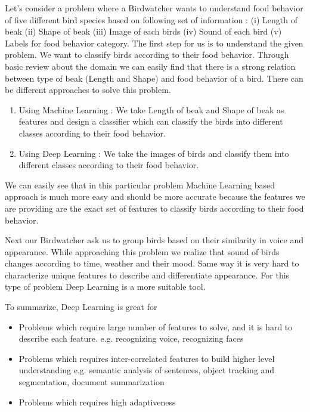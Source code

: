 \documentclass[a4paper]{article}
\begin{document}
Let's consider a problem where a Birdwatcher wants to understand food behavior of five different bird species based on following set of information : (i) Length of beak (ii) Shape of beak (iii) Image of each birds (iv) Sound of each bird (v) Labels for food behavior category. The first step for us is to understand the given problem. We want to classify birds according to their food behavior. Through basic review about the domain we can easily find that there is a strong relation between type of beak (Length and Shape) and food behavior of a bird. There can be different approaches to solve this problem. 

\begin{enumerate}
\item Using Machine Learning : We take Length of beak and Shape of beak as features and design a classifier which can classify the birds into different classes according to their food behavior. 
\item Using Deep Learning : We take the images of birds and classify them into different classes according to their food behavior.   
\end{enumerate}

We can easily see that in this particular problem Machine Learning based approach is much more easy and should be more accurate because the features we are providing are the exact set of features to classify birds according to their food behavior. 

Next our Birdwatcher ask us to group birds based on their similarity in voice and appearance. While approaching this problem we realize that sound of birds changes according to time, weather and their mood. Same way it is very hard to characterize unique features to describe and differentiate appearance. For this type of problem Deep Learning is a more suitable tool. 

To summarize, Deep Learning is great for 
\begin{itemize}
\item Problems which require large number of features to solve, and it is hard to describe each feature. e.g. recognizing voice, recognizing faces
\item Problems which requires inter-correlated features to build higher level understanding e.g. semantic analysis of sentences, object tracking and segmentation, document summarization
\item Problems which requires high adaptiveness
\end{itemize}
\end{document}
